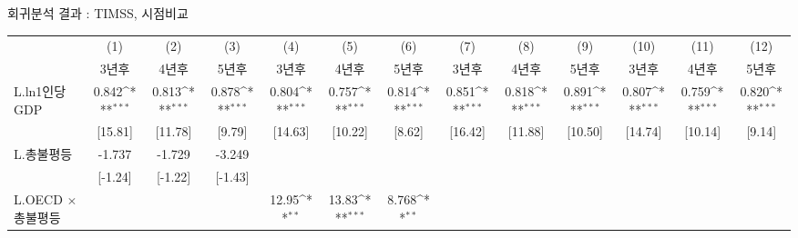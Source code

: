 \centering
\def\sym#1{\ifmmode^{#1}\else\(^{#1}\)\fi}
\caption{회귀분석 결과 : TIMSS, 시점비교 }
\label{tab:timss_rob2}
\begin{tabular}{l*{12}{c}}
\toprule
                    &\multicolumn{1}{c}{(1)}&\multicolumn{1}{c}{(2)}&\multicolumn{1}{c}{(3)}&\multicolumn{1}{c}{(4)}&\multicolumn{1}{c}{(5)}&\multicolumn{1}{c}{(6)}&\multicolumn{1}{c}{(7)}&\multicolumn{1}{c}{(8)}&\multicolumn{1}{c}{(9)}&\multicolumn{1}{c}{(10)}&\multicolumn{1}{c}{(11)}&\multicolumn{1}{c}{(12)}\\
                    &\multicolumn{1}{c}{3년후}&\multicolumn{1}{c}{4년후}&\multicolumn{1}{c}{5년후}&\multicolumn{1}{c}{3년후}&\multicolumn{1}{c}{4년후}&\multicolumn{1}{c}{5년후}&\multicolumn{1}{c}{3년후}&\multicolumn{1}{c}{4년후}&\multicolumn{1}{c}{5년후}&\multicolumn{1}{c}{3년후}&\multicolumn{1}{c}{4년후}&\multicolumn{1}{c}{5년후}\\
\midrule
L.ln1인당GDP        &       0.842\sym{***}&       0.813\sym{***}&       0.878\sym{***}&       0.804\sym{***}&       0.757\sym{***}&       0.814\sym{***}&       0.851\sym{***}&       0.818\sym{***}&       0.891\sym{***}&       0.807\sym{***}&       0.759\sym{***}&       0.820\sym{***}\\
                    &     [15.81]         &     [11.78]         &      [9.79]         &     [14.63]         &     [10.22]         &      [8.62]         &     [16.42]         &     [11.88]         &     [10.50]         &     [14.74]         &     [10.14]         &      [9.14]         \\
\addlinespace
L.총불평등          &      -1.737         &      -1.729         &      -3.249         &                     &                     &                     &                     &                     &                     &                     &                     &                     \\
                    &     [-1.24]         &     [-1.22]         &     [-1.43]         &                     &                     &                     &                     &                     &                     &                     &                     &                     \\
\addlinespace
L.OECD $\times$ 총불평등&                     &                     &                     &       12.95\sym{**} &       13.83\sym{***}&       8.768\sym{**} &                     &                     &                     &                     &                     &                     \\

\end{tabular}
